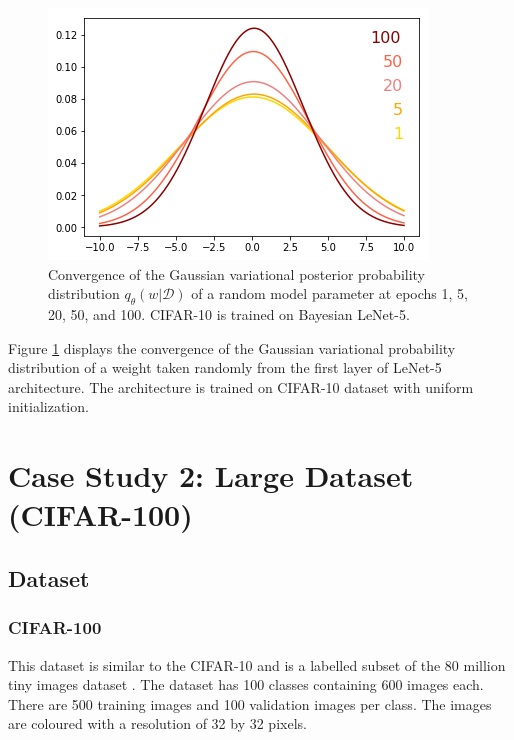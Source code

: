 \begin{figure}[H] 
\begin{center}
\includegraphics[width=\linewidth]{Chapter5/Figs/distribution.png}
\caption{Convergence of the Gaussian variational posterior probability distribution $q_{\theta}(w|\mathcal{D})$ of a random model parameter at epochs 1, 5, 20, 50, and 100. CIFAR-10 is trained on Bayesian LeNet-5.}
\label{fig:distribution}
\end{center}
\end{figure} 

\newline Figure \ref{fig:distribution} displays the convergence of the Gaussian variational probability distribution of a weight taken randomly from the first layer of LeNet-5 architecture. The architecture is trained on CIFAR-10 dataset with uniform initialization. 



\section{Case Study 2: Large Dataset (CIFAR-100)}
\subsection{Dataset}

\subsubsection{CIFAR-100}
This dataset is similar to the CIFAR-10 and is a labelled subset of the 80 million tiny images dataset \cite{Torralba:2008:MTI:1444381.1444403}. The dataset has 100 classes containing 600 images each. There are 500 training images and 100 validation images per class. The images are coloured with a resolution of 32 by 32 pixels.

